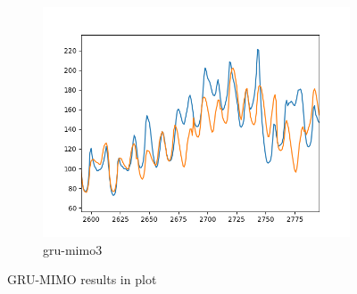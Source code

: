 \begin{figure}
\begin{subfigure}[b]{0.55\textwidth}
        \centering
        \includegraphics[width=\textwidth]{../Figures/gru-mimo-3.png}
        \caption{gru-mimo3}
        \label{fig:gru-mimo3}
    \end{subfigure}
       \caption{GRU-MIMO results in plot}
       \label{fig:gru-mimo}
\end{figure}


